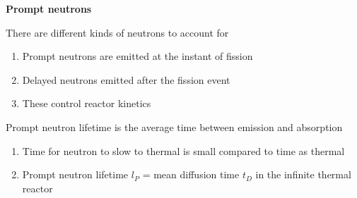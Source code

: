 \documentclass[aspectratio=1610,pdftex,dvipsnames,compress,xcolor={dvipsnames}]{beamer}
\begin{document}
\begin{frame}[plain]{}
    \centering\LARGE\textbf{Prompt neutrons}
\end{frame}


\addtocounter{framenumber}{-1} 
\begin{frame}{There are different kinds of neutrons to account for}
    \begin{enumerate}[series=outerlist,topsep=0pt,itemsep=21pt,leftmargin=*,label=(\arabic*)]
        \item[]Prompt neutrons are emitted at the instant of fission
        \item[]Delayed neutrons emitted after the fission event
        \item[]These control reactor kinetics
    \end{enumerate}
\end{frame}


\begin{frame}{Prompt neutron lifetime is the average time between emission and absorption}
    \begin{enumerate}[series=outerlist,topsep=0pt,itemsep=21pt,leftmargin=*,label=(\arabic*)]
        \item[]Time for neutron to slow to thermal is small compared to time as thermal
        \item[]Prompt neutron lifetime $l_P$ = mean diffusion time $t_D$ in the infinite thermal reactor
    \end{enumerate}
\end{frame}
\end{document}
